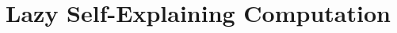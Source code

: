 \documentclass[preprint]{sigplanconf}
\begin{document}
\title{Lazy Self-Explaining Computation}

\authorinfo{}

\maketitle



{\footnotesize 
}
\end{document}
